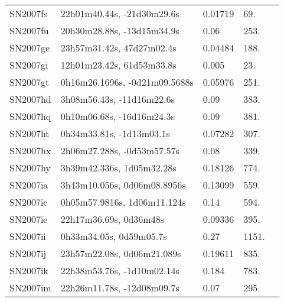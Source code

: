 \begin{longtable}{lllll}
         SN2007fs &     22h01m40.44s, -21d30m29.6s &  0.01719 &            69. &    \citet{1992ApJS...81..413M} \\
         SN2007fu &     20h30m28.88s, -13d15m34.9s &     0.06 &           253. &    \citet{2007CBET.1007A...1:} \\
         SN2007ge &      23h57m31.42s, 47d27m02.4s &  0.04484 &           188. &    \citet{1991RC3.9.C...0000d} \\
         SN2007gi &      12h01m23.42s, 61d53m33.8s &    0.005 &            23. &    \citet{2004SDSS2.C...0000:} \\
         SN2007gt &  0h16m26.1696s, -0d21m09.5688s &  0.05976 &           251. &    \citet{2016SDSSD.C...0000:} \\
         SN2007hd &      3h08m56.43s, -11d16m22.6s &     0.09 &           383. &    \citet{2007CBET.1044A...1:} \\
         SN2007hq &      0h10m06.68s, -16d16m24.3s &     0.09 &           381. &    \citet{2007CBET.1054A...1:} \\
         SN2007ht &       0h34m33.81s, -1d13m03.1s &  0.07282 &           307. &    \citet{2003SDSS1.C...0000:} \\
         SN2007hx &     2h06m27.288s, -0d53m57.57s &     0.08 &           339. &    \citet{2010ApJ...713.1026D} \\
         SN2007hy &      3h39m42.336s, 1d05m32.28s &  0.18126 &           774. &    \citet{2001SDSSe.1...0000:} \\
         SN2007ia &    3h43m10.056s, 0d06m08.8956s &  0.13099 &           559. &    \citet{2004SDSS2.C...0000:} \\
         SN2007ic &    0h05m57.9816s, 1d06m11.124s &     0.14 &           594. &    \citet{2007CBET.1057A...1:} \\
         SN2007ie &         22h17m36.69s, 0d36m48s &  0.09336 &           395. &    \citet{2016SDSSD.C...0000:} \\
         SN2007ii &        0h33m34.05s, 0d59m05.7s &     0.27 &          1151. &    \citet{2007CBET.1061A...1:} \\
         SN2007ij &     23h57m22.08s, 0d06m21.089s &  0.19611 &           835. &    \citet{2016SDSSD.C...0000:} \\
         SN2007ik &     22h38m53.76s, -1d10m02.14s &    0.184 &           783. &    \citet{2011ApJ...740...92G} \\
         SN2007im &     22h26m11.78s, -12d08m09.7s &     0.07 &           295. &    \citet{2007CBET.1063A...1:} \\

\end{longtable}
